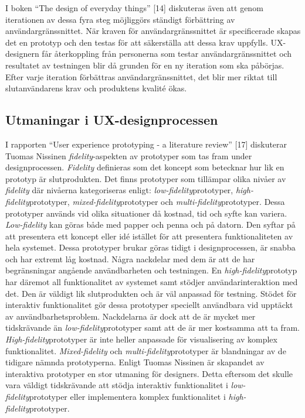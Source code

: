 \documentclass[12pt]{kththesis}
\begin{document}
I boken “The design of everyday things” [14] diskuteras även att genom iterationen av dessa fyra steg möjliggörs ständigt förbättring av användargränssnittet. När kraven för användargränssnittet är specificerade skapas det en prototyp och den testas för att säkerställa att dessa krav uppfylls. UX-designern får återkoppling från personerna som testar användargränssnittet och resultatet av testningen blir då grunden för en ny iteration som ska påbörjas. Efter varje iteration förbättras användargränssnittet, det blir mer riktat till slutanvändarens krav och produktens kvalité ökas.

\subsection{Utmaningar i UX-designprocessen}

I rapporten “User experience prototyping - a literature review” [17] diskuterar Tuomas Nissinen \textit{fidelity}-aspekten av prototyper som tas fram under designprocessen. \textit{Fidelity} definieras som det koncept som betecknar hur lik en prototyp är slutprodukten. Det finns prototyper som tillämpar olika nivåer av \textit{fidelity} där nivåerna kategoriseras enligt: \textit{low-fidelity}prototyper, \textit{high-fidelity}prototyper, \textit{mixed-fidelity}prototyper och \textit{multi-fidelity}prototyper. Dessa prototyper används vid olika situationer då kostnad, tid och syfte kan variera. \textit{Low-fidelity} kan göras både med papper och penna och på datorn. Den syftar på att presentera ett koncept eller idé istället för att presentera funktionaliteten av hela systemet. Dessa prototyper brukar göras tidigt i designprocessen, är snabba och har extremt låg kostnad. Några nackdelar med dem är att de har begränsningar angående användbarheten och testningen. En \textit{high-fidelity}prototyp har däremot all funktionalitet av systemet samt stödjer användarinteraktion med det. Den är väldigt lik slutprodukten och är väl anpassad för testning. Stödet för interaktiv funktionalitet gör dessa prototyper speciellt användbara vid upptäckt av användbarhetsproblem. Nackdelarna är dock att de är mycket mer tidskrävande än \textit{low-fidelity}prototyper samt att de är mer kostsamma att ta fram. \textit{High-fidelity}prototyper är inte heller anpassade för visualisering av komplex funktionalitet. \textit{Mixed-fidelity} och \textit{multi-fidelity}prototyper är blandningar av de tidigare nämnda prototyperna. Enligt Tuomas Nissinen är skapandet av interaktiva prototyper en stor utmaning för designers. Detta eftersom det skulle vara väldigt tidskrävande att stödja interaktiv funktionalitet i \textit{low-fidelity}prototyper eller implementera komplex funktionalitet i \textit{high-fidelity}prototyper.
\end{document}
